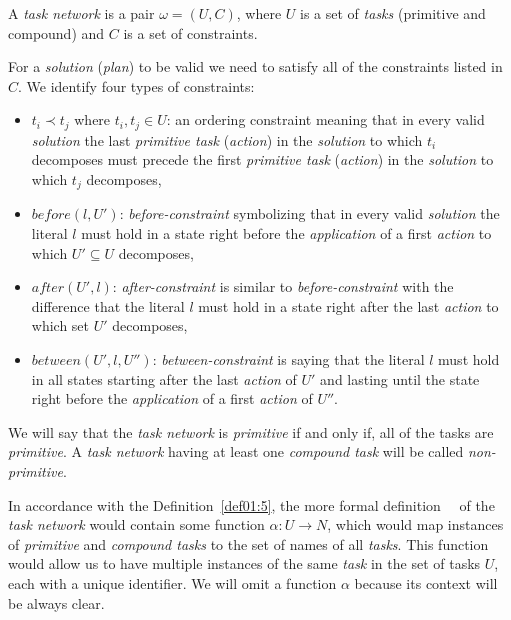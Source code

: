\begin{defn}\label{def02:9}
    A \emph{task network} is a pair $\omega = (U,C)$, where $U$ is a set of \emph{tasks} (primitive and compound) and $C$ is a set of constraints.
    
    For a \emph{solution} (\emph{plan}) to be valid we need to satisfy all of the constraints listed in $C$. We identify four types of constraints:

    \begin{itemize}
        \item $t_i \prec t_j$ where $t_i,t_j \in U$: an ordering constraint meaning that in every valid \emph{solution} the last \emph{primitive task} (\emph{action}) in the \emph{solution} to which $t_i$ decomposes must precede the first \emph{primitive task} (\emph{action}) in the \emph{solution} to which $t_j$ decomposes,
        
        \item $before(l,U')$: \emph{before-constraint} symbolizing that in every valid \emph{solution} the literal $l$ must hold in a state right before the \emph{application} of a first \emph{action} to which $U' \subseteq U$ decomposes,
    
        \item $after(U',l)$: \emph{after-constraint} is similar to \emph{before-constraint} with the difference that the literal $l$ must hold in a state right after the last \emph{action} to which set $U'$ decomposes,
    
        \item $between(U',l,U'')$: \emph{between-constraint} is saying that the literal $l$ must hold in all states starting after the last \emph{action} of $U'$ and lasting until the state right before the \emph{application} of a first \emph{action} of $U''$.
    \end{itemize}

    We will say that the \emph{task network} is \emph{primitive} if and only if, all of the tasks are \emph{primitive}. A \emph{task network} having at least one \emph{compound task} will be called \emph{non-primitive}.
\end{defn}

\medskip\noindent
In accordance with the Definition~\ref{def01:5}, the more formal definition~\cite{complexity}~\cite{langclassification} of the \emph{task network} would contain some function $\alpha: U \rightarrow N$, which would map instances of \emph{primitive} and \emph{compound tasks} to the set of names of all \emph{tasks}. This function would allow us to have multiple instances of the same \emph{task} in the set of tasks $U$, each with a unique identifier. We will omit a function $\alpha$ because its context will be always clear.

